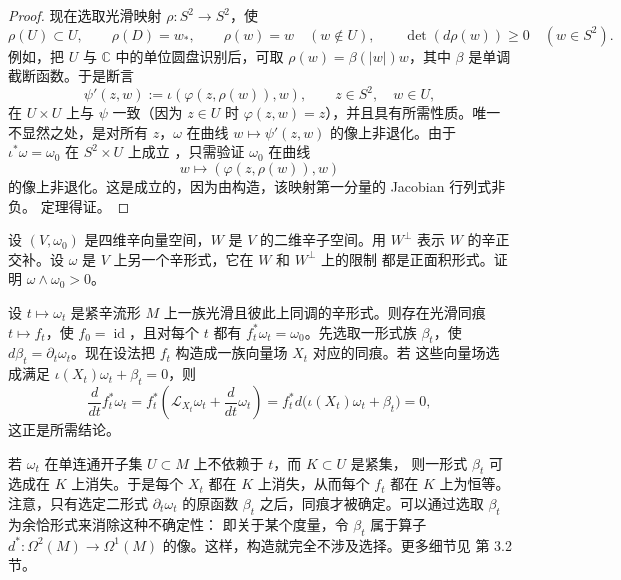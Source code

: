 \begin{proof}
现在选取光滑映射 $\rho:S^2\to S^2$，使
\[
  \rho(U)\subset U,
  \qquad
  \rho(D)=w_*,
  \qquad
  \rho(w)=w\quad(w\notin U),
  \qquad
  \det(d\rho(w))\ge0\quad(w\in S^2).
\]
例如，把 $U$ 与 $\mathbb C$ 中的单位圆盘识别后，可取
$\rho(w)=\beta(|w|)w$，其中 $\beta$ 是单调截断函数。于是断言
\[
  \psi'(z,w):=\iota(\varphi(z,\rho(w)),w),
  \qquad z\in S^2,\quad w\in U,
\]
在 $U\times U$ 上与 $\psi$ 一致（因为 $z\in U$ 时
$\varphi(z,w)=z$），并且具有所需性质。唯一不显然之处，是对所有 $z$，$\omega$ 在曲线
$w\mapsto\psi'(z,w)$ 的像上非退化。由于
$\iota^*\omega=\omega_0$ 在 $S^2\times U$ 上成立
，只需验证 $\omega_0$ 在曲线
\[
  w\longmapsto(\varphi(z,\rho(w)),w)
\]
的像上非退化。这是成立的，因为由构造，该映射第一分量的 Jacobian 行列式非负。
定理得证。
\end{proof}

\begin{exercise}\label{ex:9-4-8}
设 $(V,\omega_0)$ 是四维辛向量空间，$W$ 是 $V$ 的二维辛子空间。用 $W^\perp$ 表示
$W$ 的辛正交补。设 $\omega$ 是 $V$ 上另一个辛形式，它在 $W$ 和 $W^\perp$ 上的限制
都是正面积形式。证明 $\omega\wedge\omega_0>0$。
\end{exercise}

\begin{remark}[Moser 同痕]\label{rem:9-4-9}
设 $t\mapsto\omega_t$ 是紧辛流形 $M$ 上一族光滑且彼此上同调的辛形式。则存在光滑同痕
$t\mapsto f_t$，使 $f_0=\operatorname{id}$，且对每个 $t$ 都有
$f_t^*\omega_t=\omega_0$。先选取一形式族 $\beta_t$，使
$d\beta_t=\partial_t\omega_t$。现在设法把 $f_t$ 构造成一族向量场 $X_t$ 对应的同痕。若
这些向量场选成满足
$\iota(X_t)\omega_t+\beta_t=0$，则
\[
  \frac d{dt}f_t^*\omega_t
  =f_t^*\left(\mathcal L_{X_t}\omega_t+\frac d{dt}\omega_t\right)
  =f_t^*d\bigl(\iota(X_t)\omega_t+\beta_t\bigr)=0,
\]
这正是所需结论。

若 $\omega_t$ 在单连通开子集 $U\subset M$ 上不依赖于 $t$，而 $K\subset U$ 是紧集，
则一形式 $\beta_t$ 可选成在 $K$ 上消失。于是每个 $X_t$ 都在 $K$ 上消失，从而每个
$f_t$ 都在 $K$ 上为恒等。注意，只有选定二形式 $\partial_t\omega_t$ 的原函数
$\beta_t$ 之后，同痕才被确定。可以通过选取 $\beta_t$ 为余恰形式来消除这种不确定性：
即关于某个度量，令 $\beta_t$ 属于算子
$d^*:\Omega^2(M)\to\Omega^1(M)$ 的像。这样，构造就完全不涉及选择。更多细节见
 第 3.2 节。
\end{remark}

